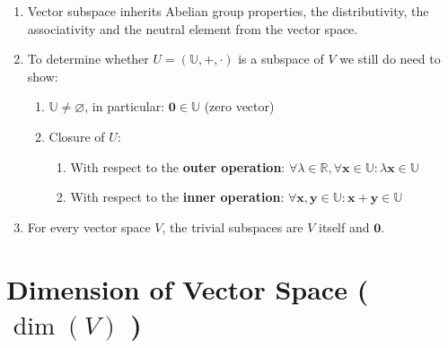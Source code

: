 \begin{enumerate}
    \item Vector subspace inherits Abelian group properties, the distributivity, the associativity and the neutral element from the vector space.

    \item To determine whether $U = (\mathbb{U}, +, \cdot)$ is a subspace of $V$ we still do need to show:
    \begin{enumerate}
        \item $\mathbb{U} \neq \varnothing$, in particular: $\mathbf{0} \in \mathbb{U}$ (zero vector)
        \item Closure of $U$:
        \begin{enumerate}
            \item With respect to the \textbf{outer operation}: $\forall\lambda \in \mathbb{R}, \forall\mathbf{x} \in \mathbb{U} : \lambda \mathbf{x} \in \mathbb{U}$
            \item With respect to the \textbf{inner operation}: $\forall\mathbf{x, y} \in \mathbb{U} : \mathbf{x + y} \in \mathbb{U}$
        \end{enumerate}
    \end{enumerate}

    \item For every vector space $V$, the trivial subspaces are $V$ itself and ${\mathbf{0}}$.
    
\end{enumerate}








\section{Dimension of Vector Space ( $\dim(V)$ ) \cite{mfml-1}}\label{lin-alg: Dimension-vector-space}

